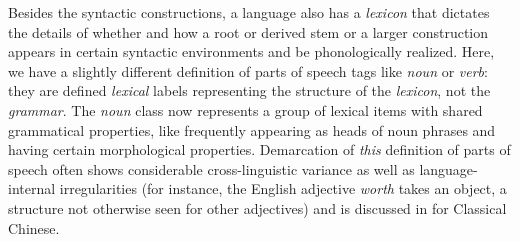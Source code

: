 \documentclass[UTF8, a4paper, oneside, scheme=plain, 12pt]{ctexrep}
\newcommand*{\term}[1]{\emph{#1}}
\newcommand{\form}[1]{\emph{#1}}
\begin{document}
Besides the syntactic constructions, 
a language also has a \emph{lexicon} that dictates 
the details of whether and how a root or derived stem or a larger construction appears
in certain syntactic environments and be phonologically realized.
Here, we have a slightly different definition of 
parts of speech tags like \term{noun} or \term{verb}:
they are defined \emph{lexical} labels 
representing the structure of the \emph{lexicon}, not the \emph{grammar}.
The \term{noun} class now represents a group of lexical items with shared grammatical properties,
like frequently appearing as heads of noun phrases and having certain morphological properties.
Demarcation of \emph{this} definition of parts of speech often shows considerable cross-linguistic variance as well as language-internal irregularities (for instance, the English adjective \form{worth} takes an object, a structure not otherwise seen for other adjectives) and is discussed in  for Classical Chinese.
\end{document}
